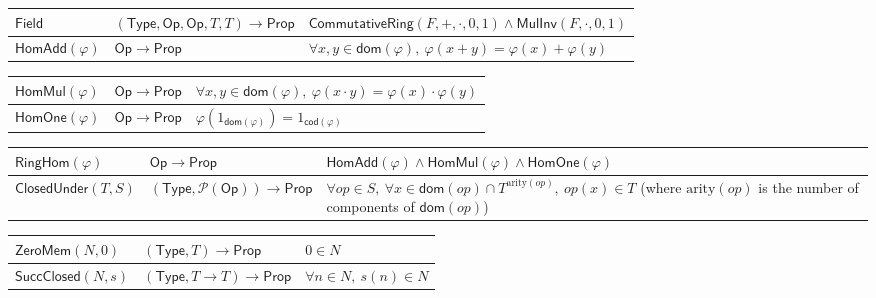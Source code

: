 \documentclass[11pt,reqno]{amsart}
\theoremstyle{blueplain}
\numberwithin{equation}{section}
\begin{document}
{\begin{tabular}{|m{4cm}|m{5cm}|m{9cm}|}
	\end{tabular}
	\noindent \newline
	\noindent
	\begin{tabular}{|m{4cm}|m{5cm}|m{9cm}|}
		\hline
		$\mathsf{Field}$ & $(\mathsf{Type},\mathsf{Op},\mathsf{Op},T,T)\to\mathsf{Prop}$ &
		$\mathsf{CommutativeRing}(F,+,\cdot,0,1)\wedge\mathsf{MulInv}(F,\cdot,0,1)$ \\ \hline
		$\mathsf{HomAdd}(\varphi)$ & $\mathsf{Op}\to\mathsf{Prop}$ &
		$\forall x,y\in\mathsf{dom}(\varphi),\ \varphi(x+y)=\varphi(x)+\varphi(y)$ \\ 
	\end{tabular}
	\noindent \newline
	\noindent
	\begin{tabular}{|m{4cm}|m{5cm}|m{9cm}|}
		\hline
		$\mathsf{HomMul}(\varphi)$ & $\mathsf{Op}\to\mathsf{Prop}$ &
		$\forall x,y\in\mathsf{dom}(\varphi),\ \varphi(x\cdot y)=\varphi(x)\cdot\varphi(y)$ \\ \hline
		$\mathsf{HomOne}(\varphi)$ & $\mathsf{Op}\to\mathsf{Prop}$ &
		$\varphi(1_{\mathsf{dom}(\varphi)})=1_{\mathsf{cod}(\varphi)}$ \\ 
	\end{tabular}
	\noindent \newline
	\noindent
	\begin{tabular}{|m{4cm}|m{5cm}|m{9cm}|}
		\hline
		$\mathsf{RingHom}(\varphi)$ & $\mathsf{Op}\to\mathsf{Prop}$ &
		$\mathsf{HomAdd}(\varphi)\wedge\mathsf{HomMul}(\varphi)\wedge\mathsf{HomOne}(\varphi)$ \\ \hline
		$\mathsf{ClosedUnder}(T,S)$ & $(\mathsf{Type},\mathcal{P}(\mathsf{Op}))\to\mathsf{Prop}$ &
		$\forall op\in S,\ \forall x\in\mathsf{dom}(op)\cap T^{\mathrm{arity}(op)},\
		op(x)\in T$ (where $\mathrm{arity}(op)$ is the number of components of
		$\mathsf{dom}(op)$) \\ 
	\end{tabular}%
	\noindent \newline
	\noindent
	\begin{tabular}{|m{4cm}|m{5cm}|m{9cm}|}
		\hline
		$\mathsf{ZeroMem}(N,0)$ & $(\mathsf{Type},T)\to\mathsf{Prop}$ &
		$0\in N$ \\ \hline
		$\mathsf{SuccClosed}(N,s)$ & $(\mathsf{Type},T\to T)\to\mathsf{Prop}$ &
		$\forall n\in N,\ s(n)\in N$ \\ 
	\end{tabular}
	\noindent \newline
	\noindent
	\begin{tabular}{|m{4cm}|m{5cm}|m{9cm}|}

\end{tabular}}
\end{document}
